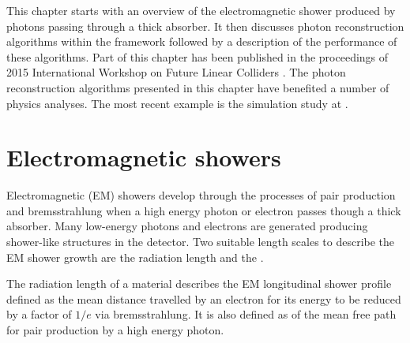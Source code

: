 This chapter starts with an overview of the electromagnetic shower produced by photons passing through a thick absorber. It then discusses photon reconstruction algorithms within the \pandora framework followed by a description of the performance of these algorithms.  Part of this chapter has been published in the proceedings of 2015 International Workshop on Future Linear Colliders \cite{Xu:2016rcz}. The photon reconstruction algorithms presented in this chapter have benefited a number of physics analyses. The most recent example  is the  \HepProcess{\PHiggs \to \Pgamma \Pgamma} simulation study at  \CLIC \cite{Kacarevic:higgsToGammaGamma}.





\section{Electromagnetic showers}
\label{sec:photonEMshower}
Electromagnetic (EM) showers develop through the processes of pair production and bremsstrahlung when a high energy photon or electron passes though a thick absorber. Many low-energy photons and electrons are generated producing shower-like  structures in the detector. Two suitable length scales to describe the EM shower growth are the radiation length and the \RM \cite{PhysRev.149.201,Bathow:1970dn}.

The radiation length of a material describes the EM longitudinal  shower profile defined as the mean distance travelled by an electron for  its energy to be reduced by a factor of $1/e$ via bremsstrahlung. It is also defined as  of the mean free path  for pair production by a high energy photon\cite{segre1977nuclei}.


